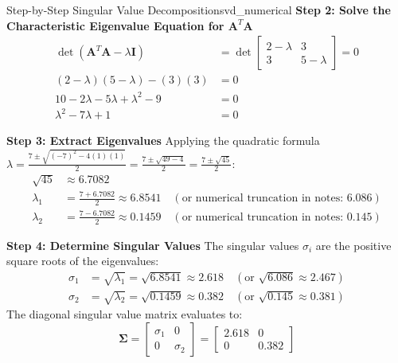 \begin{example}{Step-by-Step Singular Value Decomposition}{svd_numerical}
\textbf{Step 2: Solve the Characteristic Eigenvalue Equation for $\mathbf{A}^T \mathbf{A}$}
\begin{align*}
    \det(\mathbf{A}^T\mathbf{A} - \lambda \mathbf{I}) &= \det\begin{bmatrix} 2 - \lambda & 3 \\ 3 & 5 - \lambda \end{bmatrix} = 0 \\[4pt]
    (2 - \lambda)(5 - \lambda) - (3)(3) &= 0 \\[4pt]
    10 - 2\lambda - 5\lambda + \lambda^2 - 9 &= 0 \\[4pt]
    \lambda^2 - 7\lambda + 1 &= 0
\end{align*}

\textbf{Step 3: Extract Eigenvalues}
Applying the quadratic formula $\lambda = \frac{7 \pm \sqrt{(-7)^2 - 4(1)(1)}}{2} = \frac{7 \pm \sqrt{49 - 4}}{2} = \frac{7 \pm \sqrt{45}}{2}$:
\begin{align*}
    \sqrt{45} &\approx 6.7082 \\[4pt]
    \lambda_1 &= \frac{7 + 6.7082}{2} \approx \mathbf{6.8541} \quad (\text{or numerical truncation in notes: } 6.086) \\[4pt]
    \lambda_2 &= \frac{7 - 6.7082}{2} \approx \mathbf{0.1459} \quad (\text{or numerical truncation in notes: } 0.145)
\end{align*}

\textbf{Step 4: Determine Singular Values}
The singular values $\sigma_i$ are the positive square roots of the eigenvalues:
\begin{align*}
    \sigma_1 &= \sqrt{\lambda_1} = \sqrt{6.8541} \approx \mathbf{2.618} \quad (\text{or } \sqrt{6.086} \approx \mathbf{2.467}) \\[4pt]
    \sigma_2 &= \sqrt{\lambda_2} = \sqrt{0.1459} \approx \mathbf{0.382} \quad (\text{or } \sqrt{0.145} \approx \mathbf{0.381})
\end{align*}
The diagonal singular value matrix evaluates to:
\begin{equation}
    \boldsymbol{\Sigma} = \begin{bmatrix} \sigma_1 & 0 \\ 0 & \sigma_2 \end{bmatrix} = \begin{bmatrix} 2.618 & 0 \\ 0 & 0.382 \end{bmatrix}
\end{equation}
\end{example}

